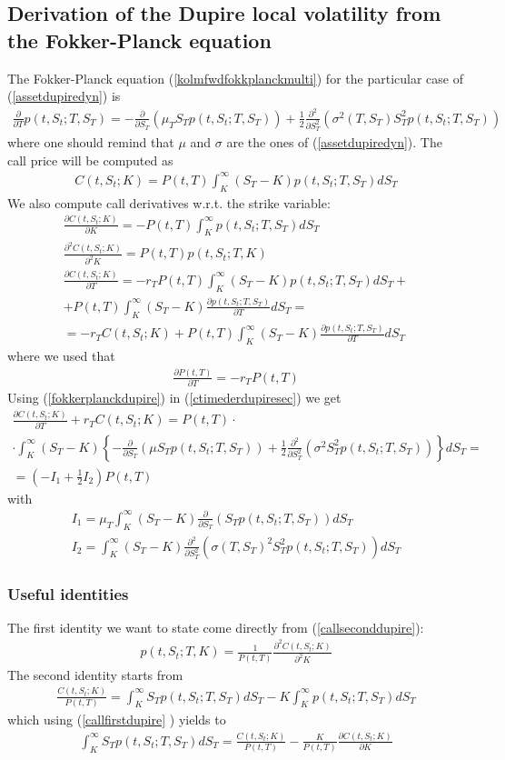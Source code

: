 \documentclass[a4paper,10pt]{report}
\theoremstyle{plain}
\theoremstyle{definition}
\newcommand\be{\begin{eqnarray}}    %
\newcommand\ee{\end{eqnarray}}
\begin{document}
\subsection{Derivation of the Dupire local volatility from the Fokker-Planck equation}
The Fokker-Planck equation (\ref{kolmfwdfokkplanckmulti}) for the particular case of (\ref{assetdupiredyn}) is
\be 
\label{fokkerplanckdupire}
\frac{\partial }{\partial T}p(t,S_t;T,S_T)= -\frac{\partial }{\partial S_T}\left(\mu_T S_T p(t,S_t;T,S_T)\right)+\frac{1}{2}\frac{\partial^2 }{\partial S_T^2}\left(\sigma^2(T,S_T)S_T^2 p(t,S_t;T,S_T)\right)
\ee
where one should remind that $\mu$ and $\sigma$ are the ones of (\ref{assetdupiredyn}).
The call price will be computed as 
\be
\label{callpricedupire}
C(t,S_t;K)= P(t,T)\int_K^\infty (S_T-K) p(t,S_t;T,S_T) dS_T
\ee
We also compute call derivatives w.r.t. the strike variable:
\be
\label{callfirstdupire} 
\frac{\partial C(t,S_t;K)}{\partial K}=- P(t,T)\int_K^\infty p(t,S_t;T,S_T) dS_T\\
\label{callseconddupire} 
\frac{\partial^2 C(t,S_t;K)}{\partial^2 K}= P(t,T) p(t,S_t;T,K) \\
\label{calltimedupire} 
\frac{\partial C(t,S_t;K)}{\partial T}=-r_T P(t,T)\int_K^\infty (S_T-K) p(t,S_t;T,S_T) dS_T
+\\
+P(t,T)\int_K^\infty (S_T-K)\frac{\partial p(t,S_t;T,S_T)}{\partial T} dS_T=\\
\label{ctimederdupiresec}
=-r_T C(t,S_t;K) + P(t,T)\int_K^\infty (S_T-K)\frac{\partial p(t,S_t;T,S_T)}{\partial T} dS_T
\ee
where we used that 
\be
\label{zerocouppnfirstdupire}
\frac{\partial P(t,T)}{\partial T} = -r_T P(t,T)
\ee
Using (\ref{fokkerplanckdupire}) in (\ref{ctimederdupiresec}) we get
\be 
\label{protodupire}
\frac{\partial C(t,S_t;K)}{\partial T}+r_T C(t,S_t;K) =P(t,T)\cdot \\
\cdot \int_K^\infty (S_T-K)\left\{ -\frac{\partial }{\partial S_T}\left(\mu S_T p(t,S_t;T,S_T)\right)+\frac{1}{2}\frac{\partial^2 }{\partial S_T^2}\left(\sigma^2S_T^2 p(t,S_t;T,S_T)\right)\right\} dS_T=\\
=\left(-I_1+\frac{1}{2}I_2\right)P(t,T)
\ee
with
\be 
\label{i1dupire}
I_1= \mu_T \int_K^\infty (S_T-K) \frac{\partial }{\partial S_T}\left(S_T p(t,S_t;T,S_T)\right)dS_T\\
\label{i2dupire}
I_2=\int_K^\infty (S_T-K) \frac{\partial^2 }{\partial S_T^2}\left(\sigma(T,S_T)^2S_T^2 p(t,S_t;T,S_T)\right) dS_T
\ee

\subsubsection{Useful identities}
The first identity we want to state come directly from (\ref{callseconddupire}):
\be 
\label{ptstTK}
p(t,S_t;T,K) = \frac{1}{P(t,T)}\frac{\partial^2 C(t,S_t;K)}{\partial^2 K}
\ee
The second identity starts from 
\be
\frac{C(t,S_t;K)}{P(t,T)} = \int_K^\infty S_T p(t,S_t;T,S_T) dS_T-K\int_K^\infty  p(t,S_t;T,S_T) dS_T
\ee
which using (\ref{callfirstdupire} ) yields to
\be 
\label{secidentdupire}
\int_K^\infty S_T p(t,S_t;T,S_T) dS_T=\frac{C(t,S_t;K)}{P(t,T)} -\frac{K}{P(t,T)}\frac{\partial C(t,S_t;K)}{\partial K}
\ee
\end{document}
